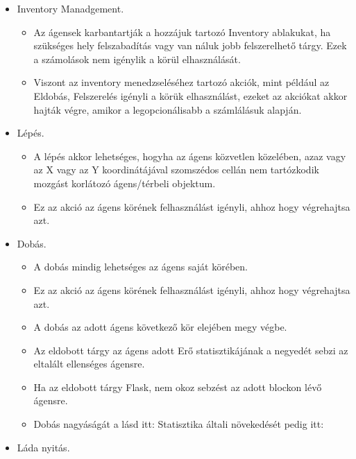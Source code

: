 \begin{itemize}
    \item Inventory Manadgement.
    
    \begin{itemize}
        \item Az ágensek karbantartják a hozzájuk tartozó Inventory ablakukat, ha szükséges hely felszabadítás vagy van náluk jobb felszerelhető tárgy. Ezek a számolások nem igénylik a körül elhasználását.
        \item Viszont az inventory menedzseléséhez tartozó akciók, mint például az Eldobás, Felszerelés igényli a körük elhasználást, ezeket az akciókat akkor hajták végre, amikor a legopcionálisabb a számlálásuk alapján.
    \end{itemize}

    \item Lépés. 
    
    \begin{itemize}
        \item A lépés akkor lehetséges, hogyha az ágens közvetlen közelében, azaz vagy az X vagy az Y koordinátájával szomszédos cellán nem tartózkodik mozgást korlátozó ágens/térbeli objektum.
        \item Ez az akció az ágens körének felhasználást igényli, ahhoz hogy végrehajtsa azt.
    \end{itemize}

    \item Dobás. 
    
    \begin{itemize}
        \item A dobás mindig lehetséges az ágens saját körében.
        \item Ez az akció az ágens körének felhasználást igényli, ahhoz hogy végrehajtsa azt.
        \item A dobás az adott ágens következő kör elejében megy végbe.
        \item Az eldobott tárgy az ágens adott Erő statisztikájának a negyedét sebzi az eltalált ellenséges ágensre.
        \item Ha az eldobott tárgy Flask, nem okoz sebzést az adott blockon lévő ágensre.
        \item Dobás nagyáságát a lásd itt:  Statisztika általi növekedését pedig itt: 
    \end{itemize}

    \item Láda nyitás. 
    

\end{itemize}
